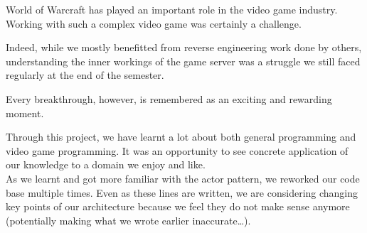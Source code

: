 \documentclass[paper=a4, fontsize=11pt]{scrartcl}
\begin{document}

World of Warcraft has played an important role in the video game industry.
Working with such a complex video game was certainly a challenge.

Indeed, while we mostly benefitted from reverse engineering work done by others,
understanding the inner workings of the game server was a struggle we still
faced regularly at the end of the semester.

Every breakthrough, however, is remembered as an exciting and rewarding
moment.

Through this project, we have learnt a lot about both general programming and
video game programming.
It was an opportunity to see concrete application of our knowledge to a domain
we enjoy and like.\\

As we learnt and got more familiar with the actor pattern, we reworked our code
base multiple times.
Even as these lines are written, we are considering changing key points of our
architecture because we feel they do not make sense anymore (potentially making
what we wrote earlier inaccurate\ldots).
\end{document}
